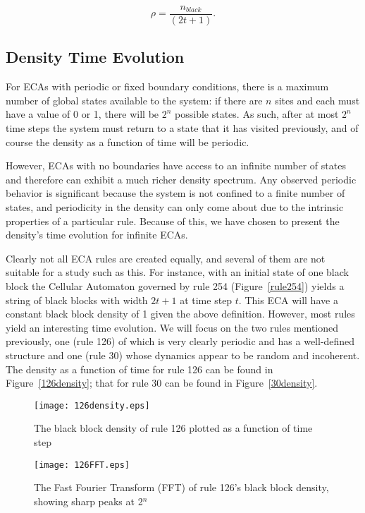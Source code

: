\begin{equation}
    \rho = \frac{n_{black}}{(2t+1)}.
\end{equation}

\subsection{Density Time Evolution}
For ECAs with periodic or fixed boundary conditions, there is a
maximum number of global states available to the system: if there are
$n$ sites and each must have a value of 0 or 1, there will be $2^n$
possible states.
As such, after at most $2^n$ time steps the system must return to
a state that it has visited previously, and of course the density as a
function of time will be periodic.

However, ECAs with no boundaries have access to an infinite number of
states and therefore can exhibit a much richer density spectrum.
Any observed periodic behavior is significant because the system is
not confined to a finite number of states, and periodicity in the
density can only come about due to the intrinsic properties of a
particular rule.
Because of this, we have chosen to present the density's time
evolution for infinite ECAs.

Clearly not all ECA rules are created equally, and several of them are
not suitable for a study such as this.
For instance, with an initial state of one black block the Cellular
Automaton governed by rule 254 (Figure~\ref{rule254}) yields a string
of black blocks with width $2t+1$ at time step $t$.
This ECA will have a constant black block density of 1 given the above
definition.
However, most rules yield an interesting time evolution.
We will focus on the two rules mentioned previously, one (rule 126) of which is
very clearly periodic and has a well-defined structure and one (rule
30) whose dynamics appear to be random and incoherent.
The density as a function of time for rule 126 can be found in
Figure~\ref{126density}; that for rule 30 can be found in
Figure~\ref{30density}.


\begin{figure}
    \begin{minipage}[b]{0.49\textwidth}
        \centering
        \texttt{[image: 126density.eps]}
        \caption{\label{126density} The black block density of rule 126 plotted as a function of time step}
    \end{minipage}
    \hspace{0.5cm}
    \begin{minipage}[b]{0.49\textwidth}
        \centering
        \texttt{[image: 126FFT.eps]}
        \caption{\label{126FFT} The Fast Fourier Transform (FFT) of
        rule 126's black block density, showing sharp peaks at 2$^n$}
    \end{minipage}
\end{figure}


